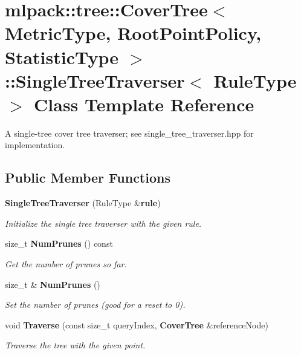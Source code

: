 \section{mlpack\-:\-:tree\-:\-:Cover\-Tree$<$ Metric\-Type, Root\-Point\-Policy, Statistic\-Type $>$\-:\-:Single\-Tree\-Traverser$<$ Rule\-Type $>$ Class Template Reference}
\label{classmlpack_1_1tree_1_1CoverTree_1_1SingleTreeTraverser}


A single-\/tree cover tree traverser; see single\-\_\-tree\-\_\-traverser.\-hpp for implementation.  


\subsection*{Public Member Functions}
\begin{DoxyCompactItemize}
\item 
{\bf Single\-Tree\-Traverser} (Rule\-Type \&{\bf rule})
\begin{DoxyCompactList}\small\item\em Initialize the single tree traverser with the given rule. \end{DoxyCompactList}\item 
size\-\_\-t {\bf Num\-Prunes} () const 
\begin{DoxyCompactList}\small\item\em Get the number of prunes so far. \end{DoxyCompactList}\item 
size\-\_\-t \& {\bf Num\-Prunes} ()
\begin{DoxyCompactList}\small\item\em Set the number of prunes (good for a reset to 0). \end{DoxyCompactList}\item 
void {\bf Traverse} (const size\-\_\-t query\-Index, {\bf Cover\-Tree} \&reference\-Node)
\begin{DoxyCompactList}\small\item\em Traverse the tree with the given point. \end{DoxyCompactList}\end{DoxyCompactItemize}
